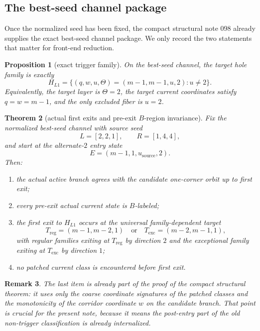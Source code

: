 \documentclass[11pt]{article}
\newtheorem{theorem}{Theorem}[section]
\newtheorem{proposition}[theorem]{Proposition}
\newtheorem{remark}[theorem]{Remark}
\begin{document}
\subsection{The best-seed channel package}

Once the normalized seed has been fixed, the compact structural note
\textup{098} already supplies the exact best-seed channel package.
We only record the two statements that matter for front-end reduction.

\begin{proposition}[exact trigger family]
\label{prop:trigger}
On the best-seed channel, the target hole family is exactly
\[
H_{L1}=\{(q,w,u,\Theta)=(m-1,m-1,u,2):u\neq 2\}.
\]
Equivalently, the target layer is $\Theta=2$, the target current coordinates
satisfy $q=w=m-1$, and the only excluded fiber is $u=2$.
\end{proposition}

\begin{theorem}[actual first exits and pre-exit $B$-region invariance]
\label{thm:098-core}
Fix the normalized best-seed channel with source seed
\[
L=[2,2,1],\qquad R=[1,4,4],
\]
and start at the alternate-$2$ entry state
\[
E=(m-1,1,u_{\mathrm{source}},2).
\]
Then:
\begin{enumerate}[label=\textup{(\arabic*)},leftmargin=2.5em]
\item the actual active branch agrees with the candidate one-corner orbit up
      to first exit;
\item every pre-exit actual current state is $B$-labeled;
\item the first exit to $H_{L1}$ occurs at the universal family-dependent
      target
      \[
      T_{\mathrm{reg}}=(m-1,m-2,1)
      \quad\text{or}\quad
      T_{\mathrm{exc}}=(m-2,m-1,1),
      \]
      with regular families exiting at $T_{\mathrm{reg}}$ by direction $2$ and
      the exceptional family exiting at $T_{\mathrm{exc}}$ by direction $1$;
\item no patched current class is encountered before first exit.
\end{enumerate}
\end{theorem}

\begin{remark}
The last item is already part of the proof of the compact structural theorem:
it uses only the coarse coordinate signatures of the patched classes and the
monotonicity of the corridor coordinate $w$ on the candidate branch.
That point is crucial for the present note, because it means the post-entry part
of the old non-trigger classification is already internalized.
\end{remark}
\end{document}
